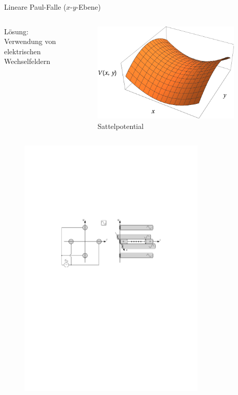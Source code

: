 \documentclass[12pt]{beamer}
\begin{document}
\begin{frame}{Lineare Paul-Falle ($x$-$y$-Ebene)}
	\begin{columns}[t]
		Lösung: Verwendung von elektrischen Wechselfeldern
		
		\begin{figure}[h]
			\centering
			\includegraphics[width=0.95\textwidth]{./figures/sattelpotential.pdf}
			\caption{Sattelpotential}
		\end{figure}
	\end{columns}
\end{frame}

\begin{frame}
	\begin{figure}[h]
		\centering
		\includegraphics*[width = 0.8\textwidth]{./figures/lineare_paulfalle.pdf}
	\end{figure}
\end{frame}
\end{document}
